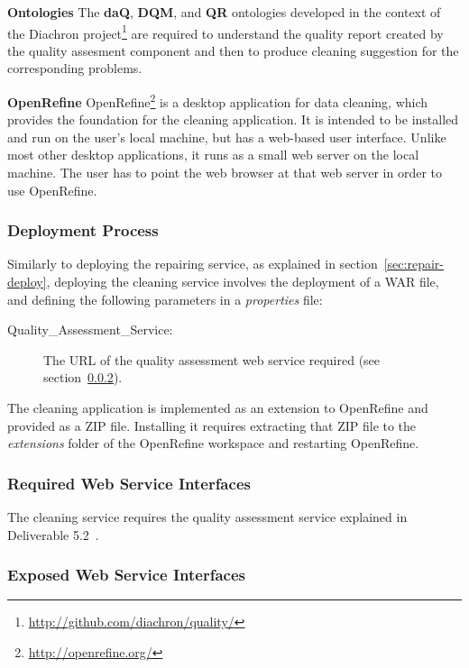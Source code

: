 \textbf{Ontologies}
The \textbf{daQ}, \textbf{DQM}, and \textbf{QR} ontologies developed in the context of the Diachron project\footnote{\url{http://github.com/diachron/quality/}} are required to understand the quality report created by the quality assesment component and then to produce cleaning suggestion for the corresponding problems.

\textbf{OpenRefine} 
OpenRefine\footnote{\url{http://openrefine.org/}} is a desktop application for data cleaning, which provides the foundation for the cleaning application.
It is intended to be installed and run on the user's local machine, but has a web-based user interface.
Unlike most other desktop applications, it runs as a small web server on the local machine.
The user has to point the web browser at that web server in order to use OpenRefine. 

\subsubsection{Deployment Process}

Similarly to deploying the repairing service, as explained in section~\ref{sec:repair-deploy}, deploying the cleaning service involves the deployment of a WAR file, and defining the following parameters in a \textit{properties} file:

\begin{description}
\item[Quality\_Assessment\_Service:] The URL of the quality assessment web service required (see section~\ref{sec:cleaning-require}).
\end{description}

The cleaning application is implemented as an extension to OpenRefine and provided as a ZIP file.
Installing it requires extracting that ZIP file to the \textit{extensions} folder of the OpenRefine workspace and restarting OpenRefine.

\subsubsection{Required Web Service Interfaces}
\label{sec:cleaning-require}

The cleaning service requires the quality assessment service explained in Deliverable 5.2~\cite[section~2.4]{diachron-d5.2}.

\subsubsection{Exposed Web Service Interfaces}
\label{sec:service-API}


